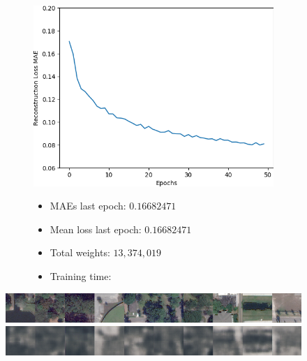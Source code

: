 \begin{figure}[H]
    \centering
    \begin{subfigure}{.5\textwidth}
        \centering
        \includegraphics[width=\textwidth]
        {images/figures/experiments_architecture/mae_graphKernel3adjusted2x2x256_dim1024.png}
    \end{subfigure}%
    \begin{subfigure}{.5\textwidth}
      \begin{itemize}
          \item MAEs last epoch: $0.16682471$
          \item Mean loss last epoch: $0.16682471$
          \item Total weights: $13,374,019$
          \item Training time:
      \end{itemize}
    \end{subfigure}
\end{figure}

\vspace{-2em}

\begin{figure}[H]
    \centering
    \includegraphics[width=\textwidth]
    {images/figures/experiments_architecture/inputsKernel3adjusted2x2x256_dim1024.png}
    \includegraphics[width=\textwidth]
    {images/figures/experiments_architecture/reconstructionsKernel3adjusted2x2x256_dim1024.png}
\end{figure}

